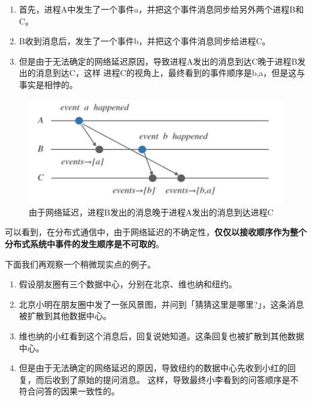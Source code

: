 \documentclass[cn,11pt,chinese]{elegantbook}
\providecommand{\tightlist}{%
  \setlength{\itemsep}{0pt}\setlength{\parskip}{0pt}}
\begin{document}
\begin{enumerate}
\def\labelenumi{\arabic{enumi}.}
\tightlist
\item
  首先，进程A中发生了一个事件a，并把这个事件消息同步给另外两个进程B和C。
\item
  B收到消息后，发生了一个事件b，并把这个事件消息同步给进程C。
\item
  但是由于无法确定的网络延迟原因，导致进程A发出的消息到达C晚于进程B发出的消息到达C，这样
  进程C的视角上，最终看到的事件顺序是b,a，但是这与事实是相悖的。
\end{enumerate}

\begin{figure}
\centering
\includegraphics{images/appendix-a-01.jpeg}
\caption{由于网络延迟，进程B发出的消息晚于进程A发出的消息到达进程C}
\end{figure}

可以看到，在分布式通信中，由于网络延迟的不确定性，\textbf{仅仅以接收顺序作为整个分布式系统中事件的发生顺序是不可取的}。

下面我们再观察一个稍微现实点的例子。

\begin{enumerate}
\def\labelenumi{\arabic{enumi}.}
\tightlist
\item
  假设朋友圈有三个数据中心，分别在北京、维也纳和纽约。
\item
  北京小明在朋友圈中发了一张风景图，并问到「猜猜这里是哪里?」，这条消息被扩散到其他数据中心。
\item
  维也纳的小红看到这个消息后，回复说她知道。这条回复也被扩散到其他数据中心。
\item
  但是由于无法确定的网络延迟的原因，导致纽约的数据中心先收到小红的回复，而后收到了原始的提问消息。
  这样，导致最终小李看到的问答顺序是不符合问答的因果一致性的。
\end{enumerate}
\end{document}
